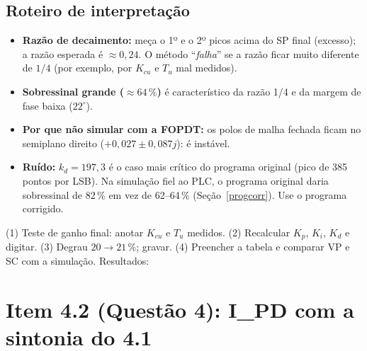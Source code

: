 \subsection{Roteiro de interpretação}
\begin{itemize}
\item \textbf{Razão de decaimento:} meça o 1º e o 2º picos acima do SP final (excesso); a razão esperada é $\approx0{,}24$. O método ``\emph{falha}'' se a razão ficar muito diferente de $1/4$ (por exemplo, por $K_{cu}$ e $T_u$ mal medidos).
\item \textbf{Sobressinal grande ($\approx64\,\%$)} é característico da razão 1/4 e da margem de fase baixa ($22^\circ$).
\item \textbf{Por que não simular com a FOPDT:} os polos de malha fechada ficam no semiplano direito ($+0{,}027\pm0{,}087j$): é instável.
\item \textbf{Ruído:} $k_d=197{,}3$ é o caso mais crítico do programa original (pico de 385 pontos por LSB). Na simulação fiel ao PLC, o programa original daria sobressinal de 82\,\% em vez de 62--64\,\% (Seção~\ref{progcorr}). Use o programa corrigido.
\end{itemize}
\begin{todo}(1) Teste de ganho final: anotar $K_{cu}$ e $T_u$ medidos. (2) Recalcular $K_p$, $K_i$, $K_d$ e digitar. (3) Degrau $20\to21\,\%$; gravar. (4) Preencher a tabela e comparar VP e SC com a simulação. Resultados: \underline{\hspace{6cm}}\end{todo}

\section{Item 4.2 (Questão 4): I\_PD com a sintonia do 4.1}\label{q42exp}

